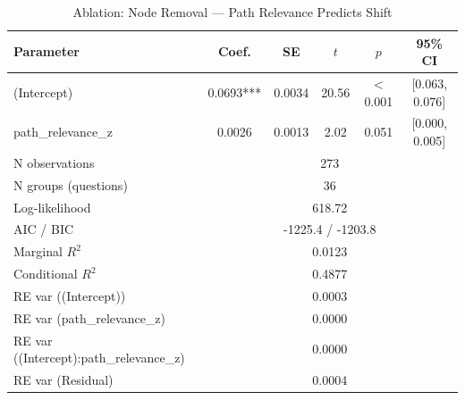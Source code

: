 \begin{table}[htbp]
\centering
\small
\caption{Ablation: Node Removal --- Path Relevance Predicts Shift}
\label{tab:lme_ablation_node_pr_table}
\begin{tabular}{lccccc}
\toprule
Parameter & Coef. & SE & $t$ & $p$ & 95\% CI \\
\midrule
  (Intercept) & 0.0693*** & 0.0034 & 20.56 & $<$0.001 & [0.063, 0.076] \\
  path\_relevance\_z & 0.0026 & 0.0013 & 2.02 & 0.051 & [0.000, 0.005] \\
\midrule
  N observations & \multicolumn{5}{c}{273} \\
  N groups (questions) & \multicolumn{5}{c}{36} \\
  Log-likelihood & \multicolumn{5}{c}{618.72} \\
  AIC / BIC & \multicolumn{5}{c}{-1225.4 / -1203.8} \\
  Marginal $R^2$ & \multicolumn{5}{c}{0.0123} \\
  Conditional $R^2$ & \multicolumn{5}{c}{0.4877} \\
  RE var ((Intercept)) & \multicolumn{5}{c}{0.0003} \\
  RE var (path\_relevance\_z) & \multicolumn{5}{c}{0.0000} \\
  RE var ((Intercept):path\_relevance\_z) & \multicolumn{5}{c}{0.0000} \\
  RE var (Residual) & \multicolumn{5}{c}{0.0004} \\
\bottomrule
\end{tabular}
\end{table}
